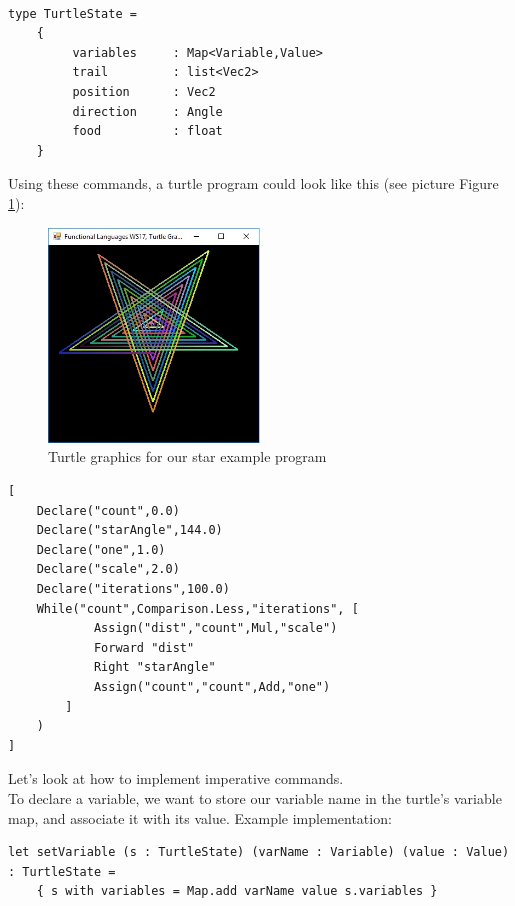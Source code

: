 \documentclass[a4paper]{article}
\begin{document}
\begin{verbatim}

type TurtleState =
    {
         variables     : Map<Variable,Value>
         trail         : list<Vec2>
         position      : Vec2
         direction     : Angle
         food          : float
    }

\end{verbatim}

\noindent Using these commands, a turtle program could look like this (see picture Figure \ref{fig1}):

\begin{figure}[ht!]
	\centering
  \includegraphics[width=0.5\textwidth]{star.jpg} %
	\caption{Turtle graphics for our star example program}
	\label{fig1}
\end{figure}

\begin{verbatim}
[
    Declare("count",0.0)
    Declare("starAngle",144.0)
    Declare("one",1.0)
    Declare("scale",2.0)
    Declare("iterations",100.0)
    While("count",Comparison.Less,"iterations", [
            Assign("dist","count",Mul,"scale")
            Forward "dist"
            Right "starAngle"
            Assign("count","count",Add,"one")
        ]
    )
]
\end{verbatim}


\noindent Let's look at how to implement imperative commands.\\
\noindent 
To declare a variable, we want to store our variable name in the turtle's variable map, and associate it with its value. Example implementation:

\begin{verbatim}
let setVariable (s : TurtleState) (varName : Variable) (value : Value) : TurtleState =
    { s with variables = Map.add varName value s.variables }

\end{verbatim}
\end{document}
